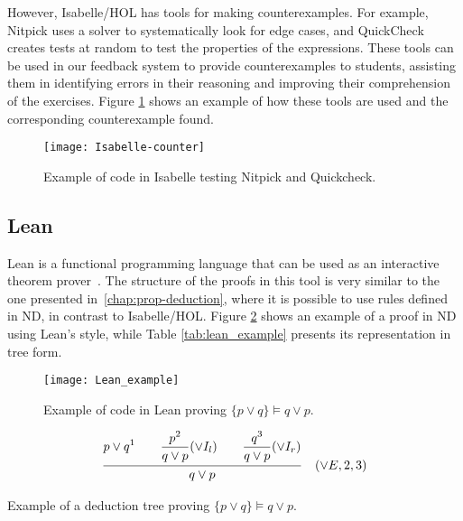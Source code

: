 However, Isabelle/HOL has tools for making counterexamples. For example, Nitpick uses a solver to systematically look for edge cases, and QuickCheck creates tests at random to test the properties of the expressions. These tools can be used in our feedback system to provide counterexamples to students, assisting them in identifying errors in their reasoning and improving their comprehension of the exercises. Figure \ref{img:isabelle-counter} shows an example of how these tools are used and the corresponding counterexample found.
\begin{figure}[htbp]
    \centering
    \texttt{[image: Isabelle-counter]}
    \caption{Example of code in Isabelle testing Nitpick and Quickcheck.}
    \label{img:isabelle-counter}
\end{figure}

\subsection{Lean}
Lean is a functional programming language that can be used as an interactive theorem prover~\cite{programming}. The structure of the proofs in this tool is very similar to the one presented in~\ref{chap:prop-deduction}, where it is possible to use rules defined in \gls{ND}, in contrast to Isabelle/HOL. Figure \ref{img:lean_example} shows an example of a proof in \gls{ND} using Lean's style, while Table \ref{tab:lean_example} presents its representation in tree form.

\begin{figure}[htbp]
    \centering
    \texttt{[image: Lean\_example]}
    \caption{Example of code in Lean proving \(\{p \lor q\} \models q \lor p \).}
    \label{img:lean_example}
\end{figure}
\begin{table}[h!]
    \centering
        \[
            \frac{ {\displaystyle {p \lor q}^1 
            \quad \quad \displaystyle \frac{\displaystyle p^2}{q \lor p \strut} (\lor I_l) \strut}
            \quad \quad \displaystyle \frac{\displaystyle q^3}{q \lor p \strut} (\lor I_r) \strut}
            {\displaystyle q \lor p \strut} \quad (\vee E, 2, 3)
          \]
          \caption{Example of a deduction tree proving \(\{p \lor q\} \models q \lor p \).}
          \label{tab:lean_example}
      \end{table}

